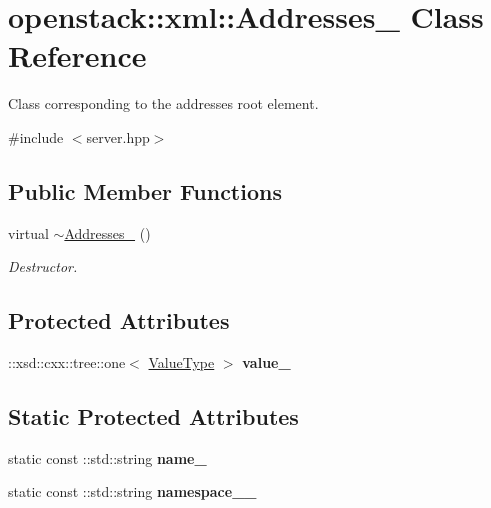 \hypertarget{classopenstack_1_1xml_1_1Addresses__}{
\section{openstack::xml::Addresses\_\- Class Reference}
\label{classopenstack_1_1xml_1_1Addresses__}
}


Class corresponding to the addresses root element.  




{\ttfamily \#include $<$server.hpp$>$}

\subsection*{Public Member Functions}
\begin{DoxyCompactItemize}
\item 
\hypertarget{classopenstack_1_1xml_1_1Addresses___a69fdc79d265d530e791e9d43446da53f}{
virtual \hyperlink{classopenstack_1_1xml_1_1Addresses___a69fdc79d265d530e791e9d43446da53f}{$\sim$Addresses\_\-} ()}
\label{classopenstack_1_1xml_1_1Addresses___a69fdc79d265d530e791e9d43446da53f}

\begin{DoxyCompactList}\small\item\em Destructor. \item\end{DoxyCompactList}\end{DoxyCompactItemize}
\subsection*{Protected Attributes}
\begin{DoxyCompactItemize}
\item 
\hypertarget{classopenstack_1_1xml_1_1Addresses___a9f8c268d57f0f34d9dcf2c9299524a7b}{
::xsd::cxx::tree::one$<$ \hyperlink{classopenstack_1_1xml_1_1Addresses}{ValueType} $>$ {\bfseries value\_\-}}
\label{classopenstack_1_1xml_1_1Addresses___a9f8c268d57f0f34d9dcf2c9299524a7b}

\end{DoxyCompactItemize}
\subsection*{Static Protected Attributes}
\begin{DoxyCompactItemize}
\item 
\hypertarget{classopenstack_1_1xml_1_1Addresses___a8df927819c28ceedb82cbec401f498b7}{
static const ::std::string {\bfseries name\_\-}}
\label{classopenstack_1_1xml_1_1Addresses___a8df927819c28ceedb82cbec401f498b7}

\item 
\hypertarget{classopenstack_1_1xml_1_1Addresses___af81cedfa43f03368b0520a2209767ba3}{
static const ::std::string {\bfseries namespace\_\-\_\-}}
\label{classopenstack_1_1xml_1_1Addresses___af81cedfa43f03368b0520a2209767ba3}

\end{DoxyCompactItemize}
